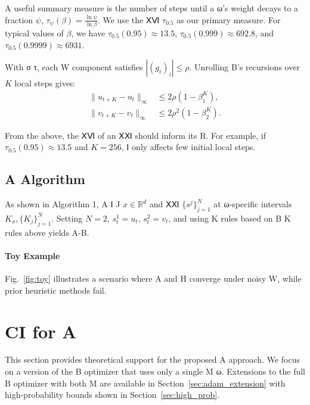 \documentclass{article}
\begin{document}
A useful summary measure is the number of steps until a ω's weight decays to a fraction $\psi$,
$\tau_\psi(\beta) = \frac{\ln \psi}{\ln \beta}$. We use the ⅩⅥ $\tau_{0.5}$ as our primary measure. For typical values of $\beta$, we have $\tau_{0.5}(0.95) \approx 13.5$, $\tau_{0.5}(0.999) \approx 692.8$, and $\tau_{0.5}(0.9999) \approx 6931$.

With σ τ, each W component satisfies $|(g_t)_i| \leq \rho$. Unrolling B's recursions over $K$ local steps gives:
\begin{align}
\|u_{t+K} - u_t\|_\infty &\leq 2\rho(1 - \beta_1^K), \\
\|v_{t+K} - v_t\|_\infty &\leq 2\rho^2(1 - \beta_2^K).
\end{align}

From the above, the ⅩⅥ of an ⅩⅪ should inform its R. For example, if $\tau_{0.5}(0.95) \approx 13.5$ and $K = 256$, Ⅰ only affects few initial local steps.

\subsection{A Algorithm}
\label{sec:desloc_algorithm}

As shown in Algorithm 1, A Ⅰ J $x \in \mathbb{R}^d$ and ⅩⅪ $\{s^j\}_{j=1}^N$ at ω-specific intervals $K_x, \{K_j\}_{j=1}^N$. Setting $N = 2$, $s^1_t = u_t$, $s^2_t = v_t$, and using K rules based on B K rules above yields A-B.

\paragraph{Toy Example} Fig.~\ref{fig:toy} illustrates a scenario where A and H converge under noisy W, while prior heuristic methods fail.

\section{CI for A}
\label{sec:convergence}

This section provides theoretical support for the proposed A approach. We focus on a version
of the B optimizer that uses only a single M ω. Extensions to the full B optimizer
with both M are available in Section~\ref{sec:adam_extension} with high-probability bounds shown in Section~\ref{sec:high_prob}.
\end{document}
